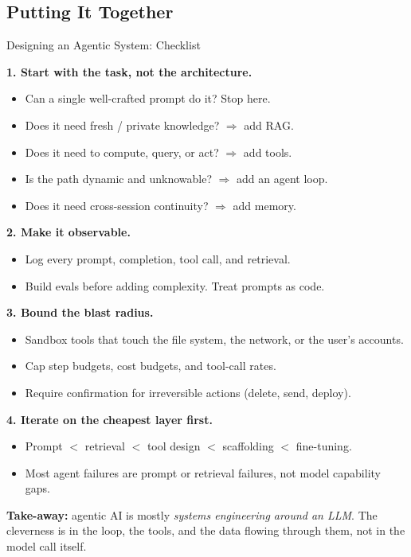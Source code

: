 \subsection{Putting It Together}

\begin{frame}{Designing an Agentic System: Checklist}

  \textbf{1. Start with the task, not the architecture.}
  \begin{itemize}[nosep]
    \item Can a single well-crafted prompt do it? Stop here.
    \item Does it need fresh / private knowledge? $\Rightarrow$ add RAG.
    \item Does it need to compute, query, or act? $\Rightarrow$ add tools.
    \item Is the path dynamic and unknowable? $\Rightarrow$ add an agent loop.
    \item Does it need cross-session continuity? $\Rightarrow$ add memory.
  \end{itemize}

  \vspace{0.3em}
  \textbf{2. Make it observable.}
  \begin{itemize}[nosep]
    \item Log every prompt, completion, tool call, and retrieval.
    \item Build evals before adding complexity. Treat prompts as code.
  \end{itemize}

  \vspace{0.3em}
  \textbf{3. Bound the blast radius.}
  \begin{itemize}[nosep]
    \item Sandbox tools that touch the file system, the network, or the user's accounts.
    \item Cap step budgets, cost budgets, and tool-call rates.
    \item Require confirmation for irreversible actions (delete, send, deploy).
  \end{itemize}

  \vspace{0.3em}
  \textbf{4. Iterate on the cheapest layer first.}
  \begin{itemize}[nosep]
    \item Prompt $<$ retrieval $<$ tool design $<$ scaffolding $<$ fine-tuning.
    \item Most agent failures are prompt or retrieval failures, not model capability gaps.
  \end{itemize}

  \vspace{0.4em}
  \textbf{Take-away:} agentic AI is mostly \emph{systems engineering around an LLM}.
  The cleverness is in the loop, the tools, and the data flowing through them, not in the model call itself.
\end{frame}
